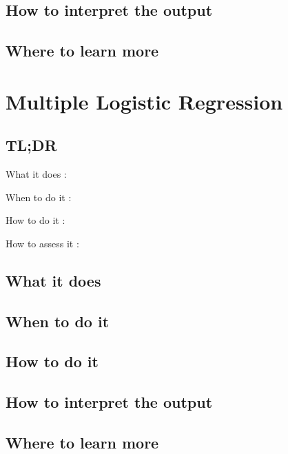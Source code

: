 \documentclass[
]{book}
\begin{document}
\hypertarget{how-to-interpret-the-output-2}{%
\section{How to interpret the output}\label{how-to-interpret-the-output-2}}

\hypertarget{where-to-learn-more-2}{%
\section{Where to learn more}\label{where-to-learn-more-2}}

\hypertarget{multiple-logistic-regression}{%
\chapter{Multiple Logistic Regression}\label{multiple-logistic-regression}}

\hypertarget{tldr-3}{%
\section{TL;DR}\label{tldr-3}}

What it does
:

When to do it
:

How to do it
:

How to assess it
:

\hypertarget{what-it-does-3}{%
\section{What it does}\label{what-it-does-3}}

\hypertarget{when-to-do-it-3}{%
\section{When to do it}\label{when-to-do-it-3}}

\hypertarget{how-to-do-it-3}{%
\section{How to do it}\label{how-to-do-it-3}}

\hypertarget{how-to-interpret-the-output-3}{%
\section{How to interpret the output}\label{how-to-interpret-the-output-3}}

\hypertarget{where-to-learn-more-3}{%
\section{Where to learn more}\label{where-to-learn-more-3}}
\end{document}
